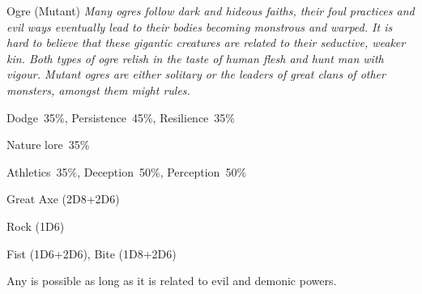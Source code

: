 \begin{monsterbox}{Ogre (Mutant)}
	\textit{Many ogres follow dark and hideous faiths, their foul practices and evil ways eventually lead to their bodies becoming monstrous and warped. It is hard to believe that these gigantic creatures are related to their seductive, weaker kin. Both types of ogre relish in the taste of human flesh and hunt man with vigour. Mutant ogres are either solitary or the leaders of great clans of other monsters, amongst them might rules.}\\
	\rpghline
	\basics[%
        hitpoints  = 18, %
	majorwound = 9,
	damagemodifier = +2D6,
	powerpoints = 10,
	movementrate = 15m,
	armor = Tough Skin (2AP),
	plunderrating = 1
	]
	\rpghline%
	\stats[ %
		STR = 3D6+12 (23),
		CON = 2D6+6  (13),
		DEX = 3D6    (11),
		SIZ = 3D6+12 (23),
		INT = 2D6+3  (10),
		POW = 2D6+3  (10),
		CHA = 1D6    (3)
	]
	\rpghline%
	\begin{rpg-monsteraction}[Resistances]
		Dodge~35\%, Persistence~45\%, Resilience~35\%
	\end{rpg-monsteraction}
	\begin{rpg-monsteraction}[Knowledge]
		Nature lore~35\%
	\end{rpg-monsteraction}
	\begin{rpg-monsteraction}[Practical]
		Athletics~35\%, Deception~50\%, Perception~50\%
	\end{rpg-monsteraction}
	\begin{rpg-monsteraction}
		Great Axe (2D8+2D6)
	\end{rpg-monsteraction}
	\begin{rpg-monsteraction}
		Rock (1D6)
	\end{rpg-monsteraction}
	\begin{rpg-monsteraction}
		Fist (1D6+2D6), Bite (1D8+2D6)
	\end{rpg-monsteraction}
	\begin{rpg-monsteraction}[Supernatural]
		Any is possible as long as it is related to evil and demonic powers.
	\end{rpg-monsteraction}

\end{monsterbox}

